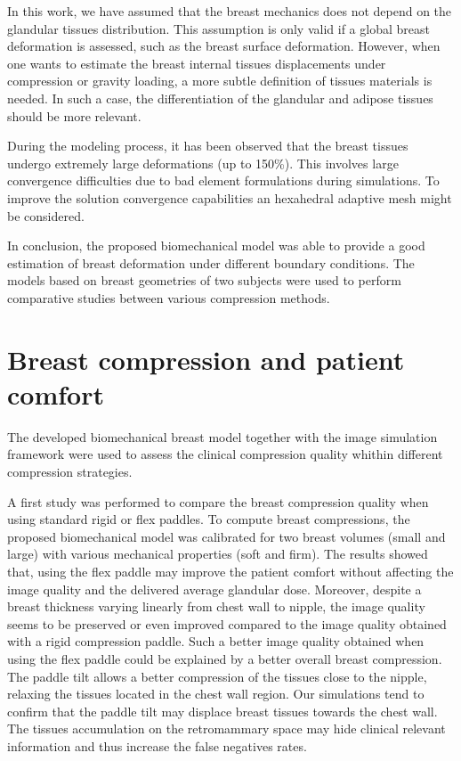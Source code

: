 In this work, we have assumed that the breast mechanics does not depend on the glandular tissues distribution. This assumption is only valid if a global breast deformation is assessed, such as the breast surface deformation. However, when one wants to estimate the breast internal tissues displacements under compression or gravity loading, a more subtle definition of tissues materials is needed. In such a case, the differentiation of the glandular and adipose tissues should be more relevant.   
   
During the modeling process, it has been observed that the breast tissues undergo extremely large deformations (up to 150\%). This involves large convergence difficulties due to bad element formulations during simulations. To improve the solution convergence capabilities an hexahedral adaptive mesh might be considered.

In conclusion, the proposed biomechanical model was able to provide a good estimation of breast deformation under different boundary conditions. The models based on breast geometries of two subjects were used to perform comparative studies between various compression methods.
 
\section{Breast compression and patient comfort}
The developed biomechanical breast model together with the image simulation framework were used to assess the clinical compression quality whithin different compression strategies.

A first study was performed to compare the breast compression quality when using standard rigid or flex paddles. To compute breast compressions, the proposed biomechanical model was calibrated for two  breast volumes (small and large) with various mechanical properties (soft and firm). The results showed that, using the flex paddle may improve the patient comfort without affecting the image quality and the delivered average glandular dose. Moreover, despite a breast thickness varying linearly from chest wall to nipple, the image quality seems to be preserved or even improved compared to the image quality obtained with a rigid compression paddle. Such a better image quality obtained when using the flex paddle could be explained by a better overall breast compression. The paddle tilt allows a better compression of the tissues close to the nipple, relaxing the tissues located in the chest wall region. Our simulations tend to confirm that the paddle tilt may displace breast tissues towards the chest wall. The tissues accumulation on the retromammary space may hide clinical relevant information and thus increase the false negatives rates. 

